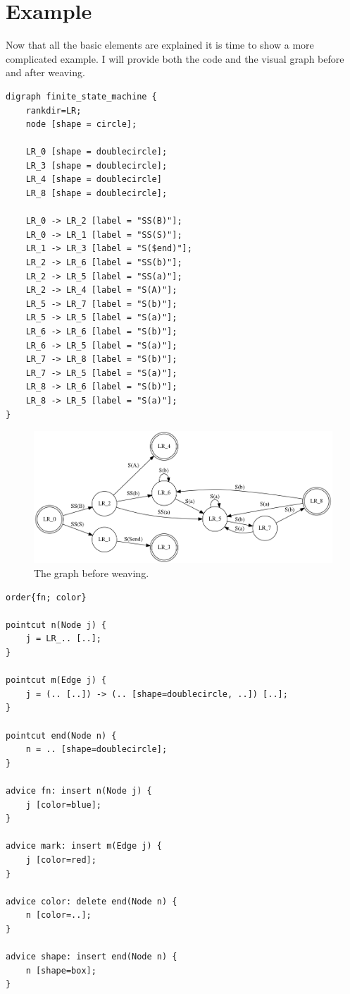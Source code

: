 \documentclass[a4paper]{report}
\begin{document}
\section{Example}
Now that all the basic elements are explained it is time to show a more complicated example. I will provide both the code and the visual graph before and after weaving.
\begin{lstlisting}[multicols=2, caption=The source code.]
digraph finite_state_machine {
	rankdir=LR;
	node [shape = circle];

	LR_0 [shape = doublecircle];
	LR_3 [shape = doublecircle];
	LR_4 [shape = doublecircle]
	LR_8 [shape = doublecircle];

	LR_0 -> LR_2 [label = "SS(B)"];
	LR_0 -> LR_1 [label = "SS(S)"];
	LR_1 -> LR_3 [label = "S($end)"];
	LR_2 -> LR_6 [label = "SS(b)"];
	LR_2 -> LR_5 [label = "SS(a)"];
	LR_2 -> LR_4 [label = "S(A)"];
	LR_5 -> LR_7 [label = "S(b)"];
	LR_5 -> LR_5 [label = "S(a)"];
	LR_6 -> LR_6 [label = "S(b)"];
	LR_6 -> LR_5 [label = "S(a)"];
	LR_7 -> LR_8 [label = "S(b)"];
	LR_7 -> LR_5 [label = "S(a)"];
	LR_8 -> LR_6 [label = "S(b)"];
	LR_8 -> LR_5 [label = "S(a)"];
}
\end{lstlisting}
\begin{figure}[h!]
\includegraphics[width=\textwidth]{images/AOFDot/ExampleBefore.png}
\caption{The graph before weaving.}
\end{figure}
\begin{lstlisting}[multicols=2, caption=Aspect code.]
order{fn; color}

pointcut n(Node j) {
	j = LR_.. [..];
}

pointcut m(Edge j) {
	j = (.. [..]) -> (.. [shape=doublecircle, ..]) [..];
}

pointcut end(Node n) {
	n = .. [shape=doublecircle];
}

advice fn: insert n(Node j) {
	j [color=blue];
}

advice mark: insert m(Edge j) {
	j [color=red];
}

advice color: delete end(Node n) {
	n [color=..];
}

advice shape: insert end(Node n) {
	n [shape=box];
}
\end{lstlisting}
\end{document}
